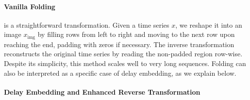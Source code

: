 \documentclass{article}
\theoremstyle{plain}
\theoremstyle{definition}
\theoremstyle{remark}
\begin{document}
{%



\paragraph{Vanilla Folding} is a straightforward transformation. Given a time series $x$, we reshape it into an image $x_\text{img}$ by filling rows from left to right and moving to the next row upon reaching the end, padding with zeros if necessary. The inverse transformation reconstructs the original time series by reading the non-padded region row-wise. Despite its simplicity, this method scales well to very long sequences. Folding can also be interpreted as a specific case of delay embedding, as we explain below.

\paragraph{Delay Embedding and Enhanced Reverse Transformation}

}
\end{document}
